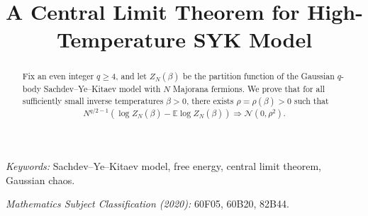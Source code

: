 \documentclass[11pt]{article}
\title{A Central Limit Theorem for High-Temperature SYK
Model}
\author{}
\date{}
\theoremstyle{remark}
\newcommand{\E}{\mathbb E}
\newcommand{\N}{\mathcal N}
\begin{document}
\maketitle

\begin{abstract}
Fix an even integer $q\geq4$, and let $Z_N(\beta)$ be the
partition function of the Gaussian $q$-body Sachdev--Ye--Kitaev model with $N$
Majorana fermions.  We prove that for all sufficiently small inverse temperatures
$\beta > 0$, there exists $\rho=\rho(\beta)>0$ such that   
\[
N^{q/2 -1}(\log Z_N(\beta)-\E \log Z_N(\beta))
  \Longrightarrow \N(0,\rho^2).
\]  
\end{abstract}

\noindent\emph{Keywords:} Sachdev--Ye--Kitaev model,
free energy, central limit theorem, Gaussian chaos.

\medskip
\noindent\emph{Mathematics Subject Classification (2020):}
60F05, 60B20, 82B44.





\end{document}
